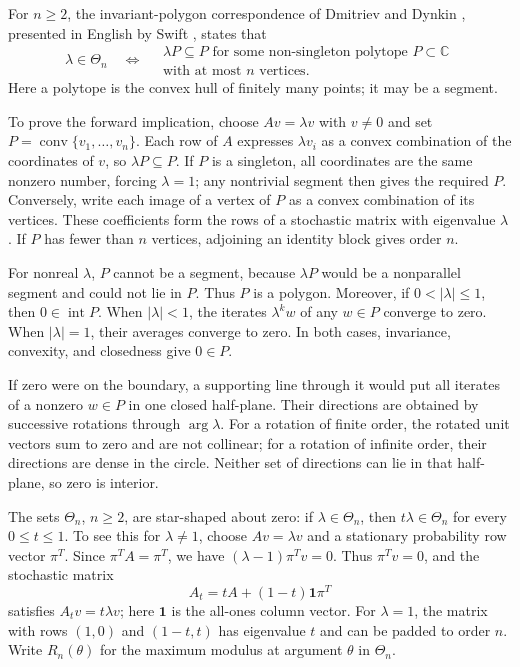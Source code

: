 \documentclass[11pt,a4paper]{article}
\newcommand{\C}{\mathbb C}
\DeclareMathOperator{\conv}{conv}
\theoremstyle{definition}
\theoremstyle{remark}
\numberwithin{equation}{section}
\begin{document}
For $n\ge2$, the invariant-polygon correspondence of Dmitriev and Dynkin \cite[\S\S1--2]{DD}, presented in English by Swift \cite{Swift}, states that
\begin{equation}\label{eq:polygon-criterion}
 \lambda\in\Theta_n\quad\Longleftrightarrow\quad
 \begin{gathered}
 \lambda P\subseteq P\text{ for some non-singleton polytope }P\subset\C\\
 \text{with at most }n\text{ vertices}.
 \end{gathered}
\end{equation}
Here a polytope is the convex hull of finitely many points; it may be a segment.

To prove the forward implication, choose $Av=\lambda v$ with $v\ne0$ and set $P=\conv\{v_1,\ldots,v_n\}$. Each row of $A$ expresses $\lambda v_i$ as a convex combination of the coordinates of $v$, so $\lambda P\subseteq P$. If $P$ is a singleton, all coordinates are the same nonzero number, forcing $\lambda=1$; any nontrivial segment then gives the required $P$. Conversely, write each image of a vertex of $P$ as a convex combination of its vertices. These coefficients form the rows of a stochastic matrix with eigenvalue $\lambda$. If $P$ has fewer than $n$ vertices, adjoining an identity block gives order $n$.

For nonreal $\lambda$, $P$ cannot be a segment, because $\lambda P$ would be a nonparallel segment and could not lie in $P$. Thus $P$ is a polygon. Moreover, if $0<|\lambda|\le1$, then $0\in\operatorname{int}P$. When $|\lambda|<1$, the iterates $\lambda^k w$ of any $w\in P$ converge to zero. When $|\lambda|=1$, their averages converge to zero. In both cases, invariance, convexity, and closedness give $0\in P$.

If zero were on the boundary, a supporting line through it would put all iterates of a nonzero $w\in P$ in one closed half-plane. Their directions are obtained by successive rotations through $\arg\lambda$. For a rotation of finite order, the rotated unit vectors sum to zero and are not collinear; for a rotation of infinite order, their directions are dense in the circle. Neither set of directions can lie in that half-plane, so zero is interior.

The sets $\Theta_n$, $n\ge2$, are star-shaped about zero: if $\lambda\in\Theta_n$, then $t\lambda\in\Theta_n$ for every $0\le t\le1$. To see this for $\lambda\ne1$, choose $Av=\lambda v$ and a stationary probability row vector $\pi^T$. Since $\pi^TA=\pi^T$, we have $(\lambda-1)\pi^Tv=0$. Thus $\pi^Tv=0$, and the stochastic matrix
\[
 A_t=tA+(1-t)\mathbf1\pi^T
\]
satisfies $A_tv=t\lambda v$; here $\mathbf1$ is the all-ones column vector. For $\lambda=1$, the matrix with rows $(1,0)$ and $(1-t,t)$ has eigenvalue $t$ and can be padded to order $n$. Write $R_n(\theta)$ for the maximum modulus at argument $\theta$ in $\Theta_n$.
\end{document}
